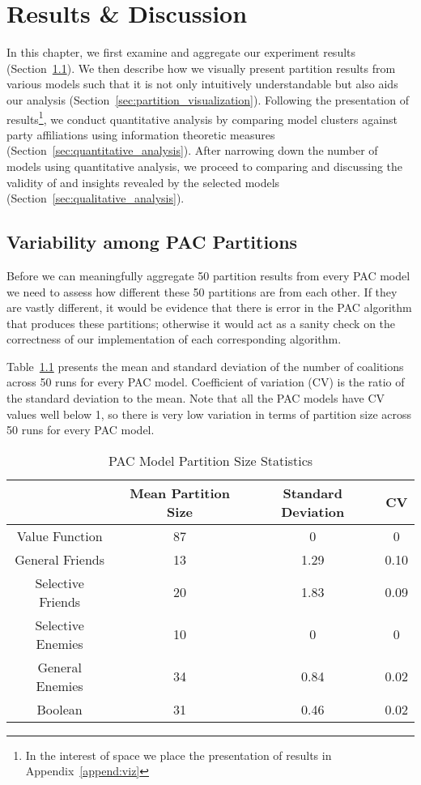 
\chapter{Results \& Discussion}
\label{ch:analysis}
\vspace{2em}

In this chapter, we first examine and aggregate our experiment results
(Section~\ref{sec:variability_among_pac_partitions}).
We then describe how we visually present partition results from various models
such that it is not only intuitively understandable but also aids our analysis
(Section~\ref{sec:partition_visualization}).
Following the presentation of results\footnote{In the interest of space we
place the presentation of results in Appendix~\ref{append:viz}}, we conduct
quantitative analysis by comparing model clusters against party affiliations
using information theoretic measures (Section~\ref{sec:quantitative_analysis}).
After narrowing down the number of models using quantitative analysis, we
proceed to comparing and discussing the validity of and insights revealed by
the selected models (Section~\ref{sec:qualitative_analysis}).


\section{Variability among PAC Partitions}
\label{sec:variability_among_pac_partitions}

Before we can meaningfully aggregate 50 partition results from every PAC model
we need to assess how different these 50 partitions are from each other.
If they are vastly different, it would be evidence that there is error in the
PAC algorithm that produces these partitions; otherwise it would act as a sanity
check on the correctness of our implementation of each corresponding algorithm.

Table~\ref{Analysis:table:pac_num_coalitions} presents the mean and standard
deviation of the number of coalitions across 50 runs for every PAC model.
Coefficient of variation (CV) is the ratio of the standard deviation to the mean.
Note that all the PAC models have CV values well below 1, so there is very low
variation in terms of partition size across 50 runs for every PAC model.

\begin{table}[h!]
\centering
\begin{tabular}{|c|c|c|c|}
\hline
       & Mean Partition Size & Standard Deviation & CV \\ \hline
Value Function & 87 & 0 & 0 \\
General Friends & 13 & 1.29 & 0.10  \\
Selective Friends & 20 & 1.83 & 0.09  \\
Selective Enemies & 10 & 0 & 0 \\
General Enemies & 34 & 0.84 & 0.02 \\
Boolean & 31 & 0.46 & 0.02  \\
\hline
\end{tabular}
\caption{PAC Model Partition Size Statistics}
\label{Analysis:table:pac_num_coalitions}
\end{table}

